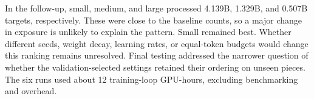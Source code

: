 In the follow-up, small, medium, and large processed 4.139B, 1.329B, and 0.507B targets, respectively. These were close to the baseline counts, so a major change in exposure is unlikely to explain the pattern. Small remained best. Whether different seeds, weight decay, learning rates, or equal-token budgets would change this ranking remains unresolved. Final testing addressed the narrower question of whether the validation-selected settings retained their ordering on unseen pieces. The six runs used about 12 training-loop GPU-hours, excluding benchmarking and overhead.

